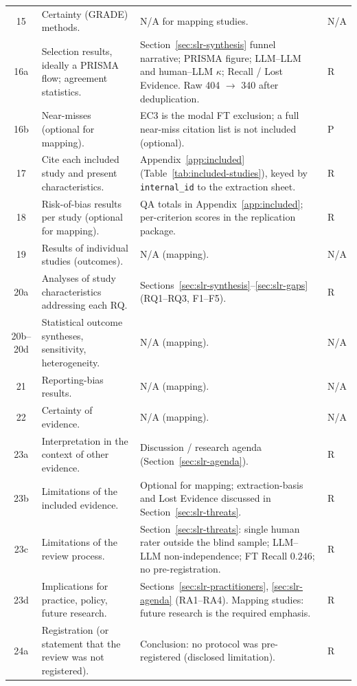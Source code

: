 \begin{longtable}{c p{4.4cm} p{6.6cm} l}
15 & Certainty (GRADE) methods. & N/A for mapping studies. & N/A \\
16a & Selection results, ideally a PRISMA flow; agreement statistics. & Section~\ref{sec:slr-synthesis} funnel narrative; PRISMA figure; LLM--LLM and human--LLM $\kappa$; Recall / Lost Evidence. Raw 404 $\rightarrow$ 340 after deduplication. & R \\
16b & Near-misses (optional for mapping). & EC3 is the modal FT exclusion; a full near-miss citation list is not included (optional). & P \\
17 & Cite each included study and present characteristics. & Appendix~\ref{app:included} (Table~\ref{tab:included-studies}), keyed by \texttt{internal\_id} to the extraction sheet. & R \\
18 & Risk-of-bias results per study (optional for mapping). & QA totals in Appendix~\ref{app:included}; per-criterion scores in the replication package. & R \\
19 & Results of individual studies (outcomes). & N/A (mapping). & N/A \\
20a & Analyses of study characteristics addressing each RQ. & Sections~\ref{sec:slr-synthesis}--\ref{sec:slr-gaps} (RQ1--RQ3, F1--F5). & R \\
20b--20d & Statistical outcome syntheses, sensitivity, heterogeneity. & N/A (mapping). & N/A \\
21 & Reporting-bias results. & N/A (mapping). & N/A \\
22 & Certainty of evidence. & N/A (mapping). & N/A \\
23a & Interpretation in the context of other evidence. & Discussion / research agenda (Section~\ref{sec:slr-agenda}). & R \\
23b & Limitations of the included evidence. & Optional for mapping; extraction-basis and Lost Evidence discussed in Section~\ref{sec:slr-threats}. & R \\
23c & Limitations of the review process. & Section~\ref{sec:slr-threats}: single human rater outside the blind sample; LLM--LLM non-independence; FT Recall $0.246$; no pre-registration. & R \\
23d & Implications for practice, policy, future research. & Sections~\ref{sec:slr-practitioners}, \ref{sec:slr-agenda} (RA1--RA4). Mapping studies: future research is the required emphasis. & R \\
24a & Registration (or statement that the review was not registered). & Conclusion: no protocol was pre-registered (disclosed limitation). & R \\

\end{longtable}
